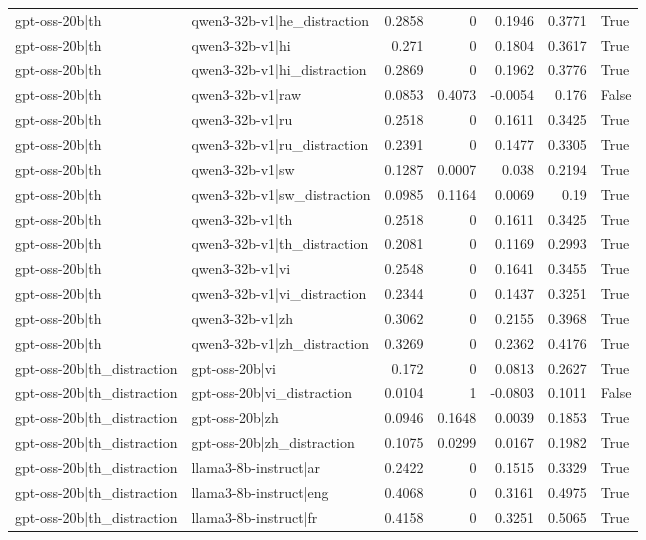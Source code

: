 \begin{table}
\begin{tabular}{l l r r r r l}
gpt-oss-20b|th & qwen3-32b-v1|he_distraction & 0.2858 & 0 & 0.1946 & 0.3771 & True \\
gpt-oss-20b|th & qwen3-32b-v1|hi & 0.271 & 0 & 0.1804 & 0.3617 & True \\
gpt-oss-20b|th & qwen3-32b-v1|hi_distraction & 0.2869 & 0 & 0.1962 & 0.3776 & True \\
gpt-oss-20b|th & qwen3-32b-v1|raw & 0.0853 & 0.4073 & -0.0054 & 0.176 & False \\
gpt-oss-20b|th & qwen3-32b-v1|ru & 0.2518 & 0 & 0.1611 & 0.3425 & True \\
gpt-oss-20b|th & qwen3-32b-v1|ru_distraction & 0.2391 & 0 & 0.1477 & 0.3305 & True \\
gpt-oss-20b|th & qwen3-32b-v1|sw & 0.1287 & 0.0007 & 0.038 & 0.2194 & True \\
gpt-oss-20b|th & qwen3-32b-v1|sw_distraction & 0.0985 & 0.1164 & 0.0069 & 0.19 & True \\
gpt-oss-20b|th & qwen3-32b-v1|th & 0.2518 & 0 & 0.1611 & 0.3425 & True \\
gpt-oss-20b|th & qwen3-32b-v1|th_distraction & 0.2081 & 0 & 0.1169 & 0.2993 & True \\
gpt-oss-20b|th & qwen3-32b-v1|vi & 0.2548 & 0 & 0.1641 & 0.3455 & True \\
gpt-oss-20b|th & qwen3-32b-v1|vi_distraction & 0.2344 & 0 & 0.1437 & 0.3251 & True \\
gpt-oss-20b|th & qwen3-32b-v1|zh & 0.3062 & 0 & 0.2155 & 0.3968 & True \\
gpt-oss-20b|th & qwen3-32b-v1|zh_distraction & 0.3269 & 0 & 0.2362 & 0.4176 & True \\
gpt-oss-20b|th_distraction & gpt-oss-20b|vi & 0.172 & 0 & 0.0813 & 0.2627 & True \\
gpt-oss-20b|th_distraction & gpt-oss-20b|vi_distraction & 0.0104 & 1 & -0.0803 & 0.1011 & False \\
gpt-oss-20b|th_distraction & gpt-oss-20b|zh & 0.0946 & 0.1648 & 0.0039 & 0.1853 & True \\
gpt-oss-20b|th_distraction & gpt-oss-20b|zh_distraction & 0.1075 & 0.0299 & 0.0167 & 0.1982 & True \\
gpt-oss-20b|th_distraction & llama3-8b-instruct|ar & 0.2422 & 0 & 0.1515 & 0.3329 & True \\
gpt-oss-20b|th_distraction & llama3-8b-instruct|eng & 0.4068 & 0 & 0.3161 & 0.4975 & True \\
gpt-oss-20b|th_distraction & llama3-8b-instruct|fr & 0.4158 & 0 & 0.3251 & 0.5065 & True \\

\end{tabular}
\end{table}
